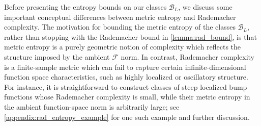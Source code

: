 \documentclass{article}
\def\cB{{\mathcal{B}}}
\def\cF{{\mathcal{F}}}
\begin{document}
Before presenting the entropy bounds on our classes $\cB_L$, we discuss some important conceptual differences between metric entropy and Rademacher complexity. The motivation for bounding the metric entropy of the classes $\cB_L$, rather than stopping with the Rademacher bound in \cref{lemma:rad_bound}, is that metric entropy is a purely geometric notion of complexity which reflects the structure imposed by the ambient $\cF$ norm. In contrast, Rademacher complexity is a finite-sample metric which can fail to capture certain infinite-dimensional function space characteristics, such as highly localized or oscillatory structure. For instance, it is straightforward to construct classes of steep localized bump functions whose Rademacher complexity is small, while their metric entropy in the ambient function-space norm is arbitrarily large; see \cref{appendix:rad_entropy_example} for one such example and further discussion. 
\end{document}
